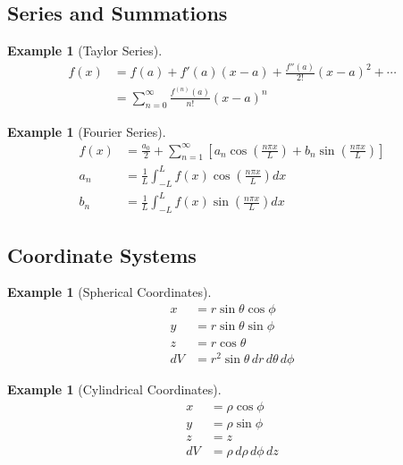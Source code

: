 \documentclass{article}
\newtheorem{example}[theorem]{Example}
\begin{document}
\subsection{Series and Summations}

\begin{example}[Taylor Series]
\begin{align*}
    f(x) &= f(a) + f'(a)(x-a) + \frac{f''(a)}{2!}(x-a)^2 + \cdots \\
    &= \sum_{n=0}^{\infty} \frac{f^{(n)}(a)}{n!}(x-a)^n
\end{align*}
\end{example}

\begin{example}[Fourier Series]
\begin{align*}
    f(x) &= \frac{a_0}{2} + \sum_{n=1}^{\infty} \left[a_n\cos\left(\frac{n\pi x}{L}\right) + b_n\sin\left(\frac{n\pi x}{L}\right)\right] \\
    a_n &= \frac{1}{L}\int_{-L}^L f(x)\cos\left(\frac{n\pi x}{L}\right)dx \\
    b_n &= \frac{1}{L}\int_{-L}^L f(x)\sin\left(\frac{n\pi x}{L}\right)dx
\end{align*}
\end{example}

\subsection{Coordinate Systems}

\begin{example}[Spherical Coordinates]
\begin{align*}
    x &= r\sin\theta\cos\phi \\
    y &= r\sin\theta\sin\phi \\
    z &= r\cos\theta \\
    dV &= r^2\sin\theta \, dr \, d\theta \, d\phi
\end{align*}
\end{example}

\begin{example}[Cylindrical Coordinates]
\begin{align*}
    x &= \rho\cos\phi \\
    y &= \rho\sin\phi \\
    z &= z \\
    dV &= \rho \, d\rho \, d\phi \, dz
\end{align*}
\end{example}
\end{document}
